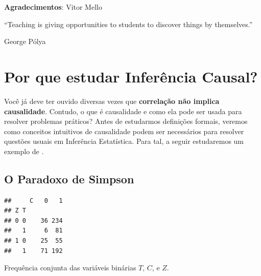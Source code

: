 



\maketitle

\vspace{20mm}

\textbf{Agradecimentos}: Vitor Mello

\newpage

\epigraph{
``Teaching is giving opportunities to students to discover things by themselves.''
}
{George P\'olya}
 
 
\newpage
 
\tableofcontents
  
\newpage




\chapter{Por que estudar Inferência Causal?}
\label{cap:intro}

Você já deve ter ouvido diversas vezes que
\textbf{correlação não implica causalidade}. Contudo,
o que é causalidade e como 
ela pode ser usada para resolver problemas práticos?
Antes de estudarmos definições formais,
veremos como conceitos intuitivos de causalidade
podem ser necessários para resolver questões
usuais em Inferência Estatística.
Para tal, a seguir estudaremos um exemplo de \citet{Glymour2016}.

\section{O Paradoxo de Simpson}
\label{sec:simpson}

\begin{table}
\begin{knitrout}
\color{fgcolor}\begin{kframe}
\begin{verbatim}
##     C   0   1
## Z T          
## 0 0    36 234
##   1     6  81
## 1 0    25  55
##   1    71 192
\end{verbatim}
\end{kframe}
\end{knitrout}
 \caption{Frequência conjunta 
 das variáveis binárias $T$, $C$, e $Z$.}
 \label{tabs:simpson}
\end{table}

